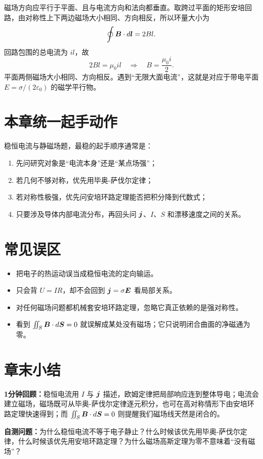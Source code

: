 \documentclass[lang=cn,11pt]{elegantbook}
\newcommand{\summaryline}[1]{\par\noindent\textbf{1分钟回顾：}#1\par}
\newcommand{\chapterselfcheck}[1]{\par\noindent\textbf{自测问题：}#1\par}
\begin{document}
\begin{solution}
磁场方向应平行于平面、且与电流方向和法向都垂直。取跨过平面的矩形安培回路，由对称性上下两边磁场大小相同、方向相反，所以环量大小为
\[
\oint \vb*{B}\cdot d\vb*{l}=2Bl.
\]
回路包围的总电流为 \(il\)，故
\[
2Bl=\mu_0 il
\quad\Longrightarrow\quad
\boxed{
B=\frac{\mu_0 i}{2}
}.
\]
平面两侧磁场大小相同、方向相反。遇到“无限大面电流”，这就是对应于带电平面 \(E=\sigma/(2\varepsilon_0)\) 的磁学平行物。
\end{solution}

\section{本章统一起手动作}

稳恒电流与静磁场题，最稳的起手顺序通常是：
\begin{enumerate}
  \item 先问研究对象是“电流本身”还是“某点场强”；
  \item 若几何不够对称，优先用毕奥-萨伐尔定律；
  \item 若对称性极强，优先问安培环路定理能否把积分降到代数式；
  \item 只要涉及导体内部电流分布，再回头问 \(\vb*{j}\)、\(I\)、\(S\) 和漂移速度之间的关系。
\end{enumerate}

\section{常见误区}

\begin{itemize}
  \item 把电子的热运动误当成稳恒电流的定向输运。
  \item 只会背 \(U=IR\)，却不会回到 \(\vb*{j}=\sigma\vb*{E}\) 看局部关系。
  \item 对任何磁场问题都机械套安培环路定理，忽略它真正依赖的是强对称性。
  \item 看到 \(\iint_S \vb*{B}\cdot d\vb*{S}=0\) 就误解成某处没有磁场；它只说明闭合曲面的净磁通为零。
\end{itemize}

\section{章末小结}

\summaryline{稳恒电流用 \(I\) 与 \(\vb*{j}\) 描述，欧姆定律把局部响应连到整体导电；电流会建立磁场，磁场既可从毕奥-萨伐尔定律逐元积分，也可在高对称情形下由安培环路定理快速得到；而 \(\iint_S \vb*{B}\cdot d\vb*{S}=0\) 则提醒我们磁场线天然是闭合的。}
\chapterselfcheck{为什么稳恒电流不等于电子静止？什么时候该优先用毕奥-萨伐尔定律，什么时候该优先用安培环路定理？为什么磁场高斯定理为零不意味着“没有磁场”？}
\end{document}
